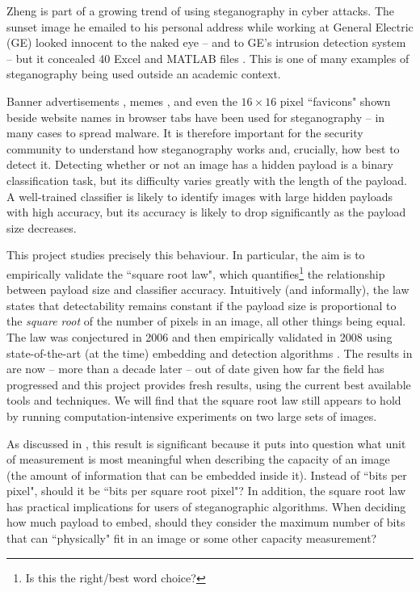 \documentclass[11pt,a4paper,twoside,openright]{report}
\begin{document}
Zheng is part of a growing trend of using steganography in cyber attacks. The sunset image  he emailed to his personal address while working at General Electric (GE) looked innocent to the naked eye -- and to GE's intrusion detection system -- but it concealed 40 Excel and MATLAB files \cite{info-sec-ge}. This is one of many examples of steganography being used outside an academic context.

Banner advertisements \cite{forbes-banner-ads}, memes \cite{trend-micro-memes}, and even the $16\times16$ pixel ``favicons" shown beside website names in browser tabs \cite{trend-micro-steganography} have been used for steganography -- in many cases to spread malware. It is therefore important for the security community to understand how steganography works and, crucially, how best to detect it. Detecting whether or not an image has a hidden payload is a binary classification task, but its difficulty varies greatly with the length of the payload. A well-trained classifier is likely to identify images with large hidden payloads with high accuracy, but its accuracy is likely to drop significantly as the payload size decreases.

This project studies precisely this behaviour. In particular, the aim is to empirically validate the ``square root law", which quantifies\footnote{Is this the right/best word choice?} the relationship between payload size and classifier accuracy. Intuitively (and informally), the law states that detectability remains constant if the payload size is proportional to the \textit{square root} of the number of pixels in an image, all other things being equal. The law was conjectured in 2006 \cite{batch-first-srl} and then empirically validated in 2008 using state-of-the-art (at the time) embedding and detection algorithms \cite{2008-paper}. The results in \cite{2008-paper} are now -- more than a decade later -- out of date given how far the field has progressed and this project provides fresh results, using the current best available tools and techniques. We will find that the square root law still appears to hold by running computation-intensive experiments on two large sets of images.

As discussed in \cite{2008-paper}, this result is significant because it puts into question what unit of measurement is most meaningful when describing the capacity of an image (the amount of information that can be embedded inside it). Instead of ``bits per pixel", should it be ``bits per square root pixel"? In addition, the square root law has practical implications for users of steganographic algorithms. When deciding how much payload to embed, should they consider the maximum number of bits that can ``physically" fit in an image or some other capacity measurement?
\end{document}
